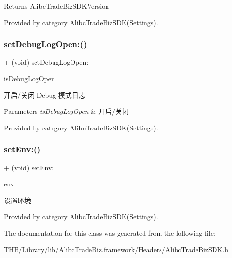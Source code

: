 \begin{DoxyReturn}{Returns}
Alibc\+Trade\+Biz\+S\+D\+K\+Version 
\end{DoxyReturn}


Provided by category \mbox{\hyperlink{category_alibc_trade_biz_s_d_k_07_settings_08_ade9e15def0980530603b5f9370de7725}{Alibc\+Trade\+Biz\+S\+D\+K(\+Settings)}}.

\mbox{\label{interface_alibc_trade_biz_s_d_k_a6f1e1ff2c21b052128dcc6cf3350a3e6}} 
\subsubsection{\texorpdfstring{set\+Debug\+Log\+Open\+:()}{setDebugLogOpen:()}}
{\footnotesize\ttfamily + (void) set\+Debug\+Log\+Open\+: \begin{DoxyParamCaption}\item[{(B\+O\+OL)}]{is\+Debug\+Log\+Open }\end{DoxyParamCaption}}

开启/关闭 Debug 模式日志


\begin{DoxyParams}{Parameters}
{\em is\+Debug\+Log\+Open} & 开启/关闭 \\
\hline
\end{DoxyParams}


Provided by category \mbox{\hyperlink{category_alibc_trade_biz_s_d_k_07_settings_08_a6f1e1ff2c21b052128dcc6cf3350a3e6}{Alibc\+Trade\+Biz\+S\+D\+K(\+Settings)}}.

\mbox{\label{interface_alibc_trade_biz_s_d_k_a41090673f57d4176b8b448a31b5abb28}} 
\subsubsection{\texorpdfstring{set\+Env\+:()}{setEnv:()}}
{\footnotesize\ttfamily + (void) set\+Env\+: \begin{DoxyParamCaption}\item[{(Alibc\+Environment)}]{env }\end{DoxyParamCaption}}

设置环境 

Provided by category \mbox{\hyperlink{category_alibc_trade_biz_s_d_k_07_settings_08_a41090673f57d4176b8b448a31b5abb28}{Alibc\+Trade\+Biz\+S\+D\+K(\+Settings)}}.



The documentation for this class was generated from the following file\+:\begin{DoxyCompactItemize}
\item 
T\+H\+B/\+Library/lib/\+Alibc\+Trade\+Biz.\+framework/\+Headers/Alibc\+Trade\+Biz\+S\+D\+K.\+h\end{DoxyCompactItemize}
